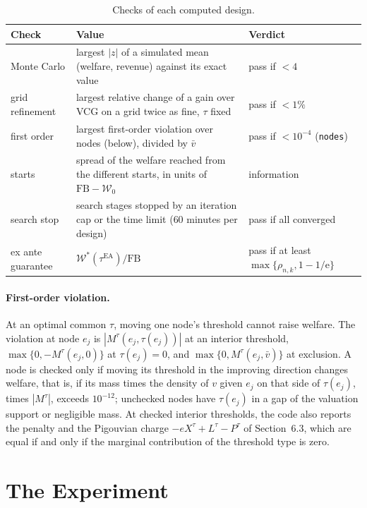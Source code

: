 \documentclass[11pt]{article}
\newcommand{\W}{\mathcal{W}}
\newcommand{\FB}{\mathrm{FB}}
\newcommand{\tauea}{\tau^{\mathrm{EA}}}
\newcommand{\eul}{\mathrm{e}}
\newcommand{\code}[1]{\texttt{#1}}
\begin{document}
\begin{table}[ht]
\centering\small
\begin{tabularx}{\linewidth}{@{}l L L@{}}
\toprule
Check & Value & Verdict \\
\midrule
Monte Carlo & largest $|z|$ of a simulated mean (welfare, revenue) against its exact value & pass if $<4$ \\
grid refinement & largest relative change of a gain over VCG on a grid twice as fine, $\tau$ fixed & pass if $<1\%$ \\
first order & largest first-order violation over nodes (below), divided by $\bar v$ & pass if $<10^{-4}$ (\code{nodes}) \\
starts & spread of the welfare reached from the different starts, in units of $\FB-\W_0$ & information \\
search stop & search stages stopped by an iteration cap or the time limit ($60$ minutes per design) & pass if all converged \\
ex ante guarantee & $\W^*(\tauea)/\FB$ & pass if at least $\max\{\rho_{n,k},1-1/\eul\}$ \\
\bottomrule
\end{tabularx}
\caption{Checks of each computed design.}
\label{tab:checks}
\end{table}

\paragraph{First-order violation.} At an optimal common $\tau$, moving one node's threshold cannot raise welfare. The violation at node $e_j$ is $|M^\tau(e_j,\tau(e_j))|$ at an interior threshold, $\max\{0,-M^\tau(e_j,0)\}$ at $\tau(e_j)=0$, and $\max\{0,M^\tau(e_j,\bar v)\}$ at exclusion. A node is checked only if moving its threshold in the improving direction changes welfare, that is, if its mass times the density of $v$ given $e_j$ on that side of $\tau(e_j)$, times $|M^\tau|$, exceeds $10^{-12}$; unchecked nodes have $\tau(e_j)$ in a gap of the valuation support or negligible mass. At checked interior thresholds, the code also reports the penalty and the Pigouvian charge $-eX^\tau+L^\tau-P^\tau$ of Section~6.3, which are equal if and only if the marginal contribution of the threshold type is zero.

\section{The Experiment}\label{sec:experiment}
\end{document}
